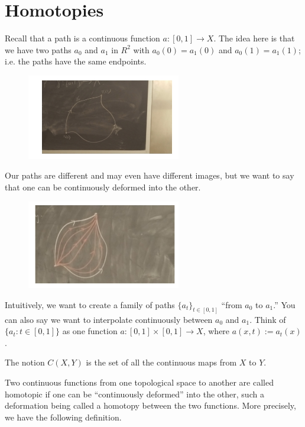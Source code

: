 \chapter{Homotopies}\label{chp:4_1}

Recall that a path is a continuous function $a : [0, 1] \rightarrow X$. 
The idea here is that we have two paths $a_0$ and $a_1$ in $R^2$ 
with $a_0(0) = a_1(0)$ and $a_0(1) = a_1(1)$;
i.e. the paths have the same endpoints.

\begin{figure}[H]
    \centering
    \includegraphics[width=0.6\textwidth]{figure/homotopy1.png}
    \caption{}
\end{figure}

Our paths are different and may even have different images, but we want to say that one
can be continuously deformed into the other.

\begin{figure}[H]
    \centering
    \includegraphics[width=0.6\textwidth]{figure/homotopy2.png}
    \caption{}
\end{figure}

Intuitively, we want to create a family of paths $\{a_t\}_{t\in[0,1]}$ “from $a_0$ to $a_1$.” 
You can also say we want to interpolate continuously between $a_0$ and $a_1$. 
Think of $\{a_t: t \in [0, 1]\}$
as one function $a : [0, 1] \times [0, 1] \rightarrow X$, 
where $a(x, t) := a_t(x)$.


The notion $C(X,Y)$ is the set of all the continuous maps from $X$ to $Y$.

Two continuous functions from one topological space to another are called homotopic if one can be “continuously deformed” into the other, such a deformation being
called a homotopy between the two functions. More precisely, we have the following
definition.

